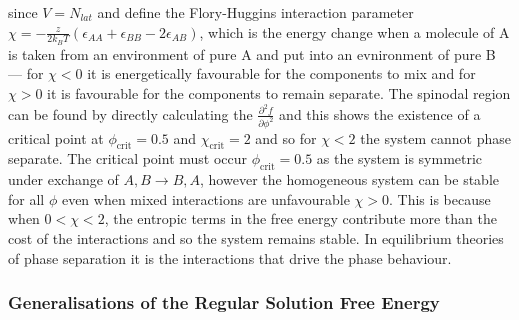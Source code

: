 since $V = N_{lat}$ and define the Flory-Huggins interaction parameter $\chi = -\frac{z}{2 k_B T} (\epsilon_{AA} + \epsilon_{BB} - 2\epsilon_{AB})$, which is the energy change when a molecule of A is taken from an environment of pure A and put into an evnironment of pure B --- for $\chi<0$ it is energetically favourable for the components to mix and for $\chi>0$ it is favourable for the components to remain separate. The spinodal region can be found by directly calculating the $\frac{\partial^2f}{\partial\phi^2}$ and this shows the existence of a critical point at $\phi_\text{crit}=0.5$ and $\chi_\text{crit}=2$ and so for $\chi<2$ the system cannot phase separate. The critical point must occur $\phi_\text{crit}=0.5$ as the system is symmetric under exchange of $A, B \rightarrow B, A$, however the homogeneous system can be stable for all $\phi$ even when mixed interactions are unfavourable $\chi>0$. This is because when $0<\chi<2$, the entropic terms in the free energy contribute more than the cost of the interactions and so the system remains stable. In equilibrium theories of phase separation it is the interactions that drive the phase behaviour.

\subsubsection{Generalisations of the Regular Solution Free Energy}

